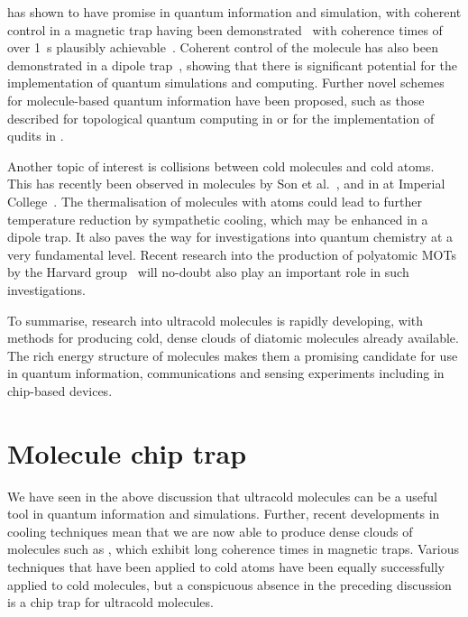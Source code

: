 \CaF{} has shown to have promise in quantum information and simulation, with
coherent control in a magnetic trap having been
demonstrated~\cite{WilliamsMagnetic2018, Blackmore_2018} with coherence times
of over \SI{1}{\second} plausibly achievable~\cite{PhysRevLett.124.063001}.
Coherent control of the molecule has also been demonstrated in a dipole
trap~\cite{PhysRevLett.127.123202}, showing that there is significant potential
for the implementation of quantum simulations and computing. Further novel
schemes for molecule-based quantum information have been proposed, such as
those described for topological quantum computing in  or
for the implementation of qudits in .

Another topic of interest is collisions between cold molecules and cold atoms.
This has recently been observed in \NaLi{} molecules by Son et
al.~\cite{son2019collisional}, and in \CaF{} at Imperial
College~\cite{Jurgilas2021, JurgilasPRL_2021}. The thermalisation of molecules
with atoms could lead to further temperature reduction by sympathetic cooling,
which may be enhanced in a dipole trap. It also paves the way for
investigations into quantum chemistry at a very fundamental level. Recent
research into the production of polyatomic MOTs by the Harvard
group~\cite{Vilas2021} will no-doubt also play an important role in
such investigations.

To summarise, research into ultracold molecules is rapidly developing, with
methods for producing cold, dense clouds of diatomic molecules already
available. The rich energy structure of molecules makes them a promising
candidate for use in quantum information, communications and sensing
experiments including in chip-based devices.

\section{Molecule chip trap}

We have seen in the above discussion that ultracold molecules can be a useful
tool in quantum information and simulations. Further, recent developments in
cooling techniques mean that we are now able to produce dense clouds of
molecules such as \CaF{}, which exhibit long coherence times in magnetic traps.
Various techniques that have been applied to cold atoms have been equally
successfully applied to cold molecules, but a conspicuous absence in the
preceding discussion is a chip trap for ultracold molecules.

